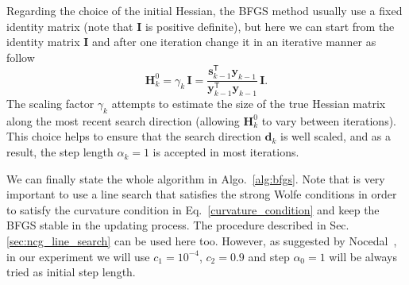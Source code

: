 \documentclass[11pt]{article}
\begin{document}
Regarding the choice of the initial Hessian, the BFGS method usually use a fixed identity matrix (note that $\mathbf{I}$ is positive definite), but here we can start from the identity matrix $\mathbf{I}$ and after one iteration change it in an iterative manner as follow
\begin{equation}\label{initial_matrix}
    \mathbf{H}_k^0 = \gamma_k \, \mathbf{I} = \frac{\mathbf{s}_{k-1}^\mathsf{T} \mathbf{y}_{k-1}}{\mathbf{y}_{k-1}^\mathsf{T}\mathbf{y}_{k-1}} \,\mathbf{I}.
\end{equation}
The scaling factor $\gamma_k$ attempts to estimate the size of the true Hessian matrix along the most recent search direction (allowing $\mathbf{H}_k^0$ to vary between iterations). This choice helps to ensure that the search direction $\mathbf{d}_k$ is well scaled, and as a result, the step length $\alpha_k = 1$ is accepted in most iterations. 

We can finally state the whole algorithm in Algo.~\ref{alg:bfgs}. Note that is very important to use a line search that satisfies the strong Wolfe conditions in order to satisfy the curvature condition in Eq.~\ref{curvature_condition} and keep the BFGS stable in the updating process. The procedure described in Sec. \ref{sec:ncg_line_search} can be used here too. However, as suggested by Nocedal~\cite{Nocedal}, in our experiment we will use $c_1 = 10^{-4}$, $c_2 = 0.9$ and step $\alpha_0 = 1$ will be always tried as initial step length.\\
\end{document}
